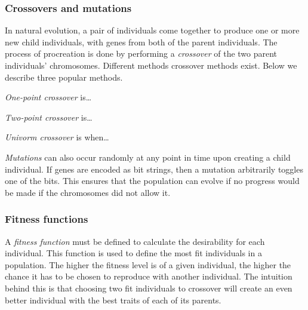 
\subsubsection{Crossovers and mutations}
In natural evolution, a pair of individuals come together to produce one or more new child individuals, with genes from both of the parent individuals. The process of procreation is done by performing a \emph{crossover} of the two parent individuals' chromosomes. Different methods crossover methods exist. Below we describe three popular methods.

\emph{One-point crossover} is\ldots

\emph{Two-point crossover} is\ldots

\emph{Univorm crossover} is when\ldots




\emph{Mutations} can also occur randomly at any point in time upon creating a child individual. If genes are encoded as bit strings, then a mutation arbitrarily toggles one of the bits. This ensures that the population can evolve if no progress would be made if the chromosomes did not allow it.

\subsubsection{Fitness functions}
A \emph{fitness function} must be defined to calculate the desirability for each individual. This function is used to define the most fit individuals in a population. The higher the fitness level is of a given individual, the higher the chance it has to be chosen to reproduce with another individual. The intuition behind this is that choosing two fit individuals to crossover will create an even better individual with the best traits of each of its parents.
